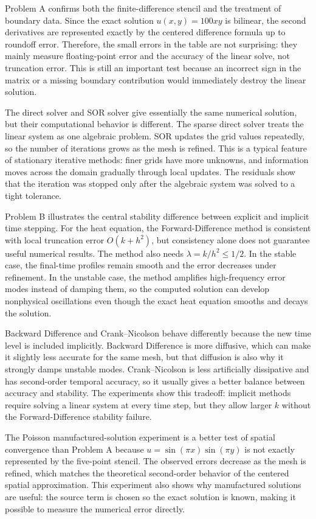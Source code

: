 \documentclass[11pt]{article}
\begin{document}
Problem A confirms both the finite-difference stencil and the treatment of
boundary data. Since the exact solution \(u(x,y)=100xy\) is bilinear, the
second derivatives are represented exactly by the centered difference formula up
to roundoff error. Therefore, the small errors in the table are not surprising:
they mainly measure floating-point error and the accuracy of the linear solve,
not truncation error. This is still an important test because an incorrect sign
in the matrix or a missing boundary contribution would immediately destroy the
linear solution.

The direct solver and SOR solver give essentially the same numerical solution,
but their computational behavior is different. The sparse direct solver treats
the linear system as one algebraic problem. SOR updates the grid values
repeatedly, so the number of iterations grows as the mesh is refined. This is a
typical feature of stationary iterative methods: finer grids have more unknowns,
and information moves across the domain gradually through local updates. The
residuals show that the iteration was stopped only after the algebraic system
was solved to a tight tolerance.

Problem B illustrates the central stability difference between explicit and
implicit time stepping. For the heat equation, the Forward-Difference method is
consistent with local truncation error \(O(k+h^2)\), but consistency alone does
not guarantee useful numerical results. The method also needs
\(\lambda=k/h^2\leq 1/2\). In the stable case, the final-time profiles remain
smooth and the error decreases under refinement. In the unstable case, the
method amplifies high-frequency error modes instead of damping them, so the
computed solution can develop nonphysical oscillations even though the exact
heat equation smooths and decays the solution.

Backward Difference and Crank--Nicolson behave differently because the new time
level is included implicitly. Backward Difference is more diffusive, which can
make it slightly less accurate for the same mesh, but that diffusion is also why
it strongly damps unstable modes. Crank--Nicolson is less artificially
dissipative and has second-order temporal accuracy, so it usually gives a better
balance between accuracy and stability. The experiments show this tradeoff:
implicit methods require solving a linear system at every time step, but they
allow larger \(k\) without the Forward-Difference stability failure.

The Poisson manufactured-solution experiment is a better test of spatial
convergence than Problem A because \(u=\sin(\pi x)\sin(\pi y)\) is not exactly
represented by the five-point stencil. The observed errors decrease as the mesh
is refined, which matches the theoretical second-order behavior of the centered
spatial approximation. This experiment also shows why manufactured solutions
are useful: the source term is chosen so the exact solution is known, making it
possible to measure the numerical error directly.
\end{document}
